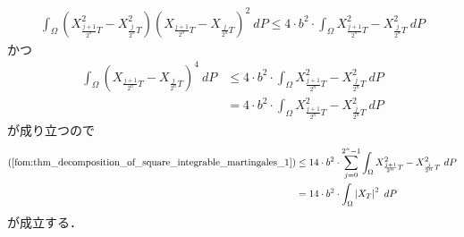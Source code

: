 \begin{sketch}
\begin{description}
\begin{align}
					\int_\Omega \left( X^2_{\frac{j+1}{2^n}T} - X^2_{\frac{j}{2^n}T} \right) \left(X_{\frac{j+1}{2^n}T} - X_{\frac{j}{2^n}T}\right)^2\ dP
					\leq 4 \cdot b^2 \cdot \int_\Omega X^2_{\frac{j+1}{2^n}T} - X^2_{\frac{j}{2^n}T}\ dP
				\end{align}
				かつ
				\begin{align}
					\int_\Omega \left(X_{\frac{j+1}{2^n}T} - X_{\frac{j}{2^n}T}\right)^4\ dP
					&\leq 4 \cdot b^2 \cdot \int_\Omega X^2_{\frac{j+1}{2^n}T} - X^2_{\frac{j}{2^n}T}\ dP \\
					&= 4 \cdot b^2 \cdot \int_\Omega X^2_{\frac{j+1}{2^n}T} - X^2_{\frac{j}{2^n}T}\ dP
				\end{align}
				が成り立つので
				\begin{align}
					(\refeq{fom:thm_decomposition_of_square_integrable_martingales_1})
					&\leq 14 \cdot b^2 \cdot \sum_{j=0}^{2^n-1} \int_\Omega X^2_{\frac{j+1}{2^n}T} - X^2_{\frac{j}{2^n}T}\ dP \\
					&= 14 \cdot b^2 \cdot \int_\Omega \left|X_T\right|^2\ dP
				\end{align}
				が成立する．
				

\end{description}
\end{sketch}
